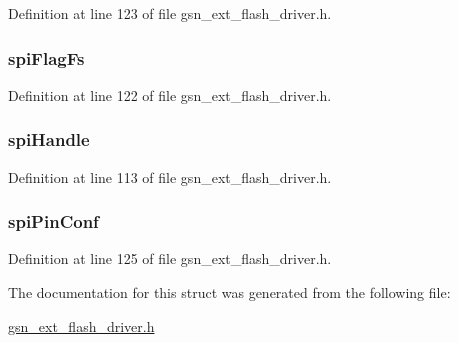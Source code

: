 Definition at line 123 of file gsn\_\-ext\_\-flash\_\-driver.h.

\hypertarget{a00071_a7d9aa824a9e4e0dfc141a119564b53aa}{
\subsubsection[{spiFlagFs}]{ {\bf spiFlagFs}}}
\label{a00071_a7d9aa824a9e4e0dfc141a119564b53aa}


Definition at line 122 of file gsn\_\-ext\_\-flash\_\-driver.h.

\hypertarget{a00071_a7e0135436cf308167541ff8fbb5756f4}{
\subsubsection[{spiHandle}]{ {\bf spiHandle}}}
\label{a00071_a7e0135436cf308167541ff8fbb5756f4}


Definition at line 113 of file gsn\_\-ext\_\-flash\_\-driver.h.

\hypertarget{a00071_a0ce711399524b300b375158a427b8888}{
\subsubsection[{spiPinConf}]{ {\bf spiPinConf}}}
\label{a00071_a0ce711399524b300b375158a427b8888}


Definition at line 125 of file gsn\_\-ext\_\-flash\_\-driver.h.



The documentation for this struct was generated from the following file:\begin{DoxyCompactItemize}
\item 
\hyperlink{a00496}{gsn\_\-ext\_\-flash\_\-driver.h}\end{DoxyCompactItemize}
